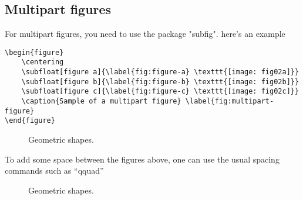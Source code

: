 \subsection{Multipart figures}
For multipart figures, you need to use the package "subfig". here's an example
\begin{verbatim}
\begin{figure}
    \centering
    \subfloat[figure a]{\label{fig:figure-a} \texttt{[image: fig02a]}}
    \subfloat[figure b]{\label{fig:figure-b} \texttt{[image: fig02b]}}
    \subfloat[figure c]{\label{fig:figure-c} \texttt{[image: fig02c]}}
    \caption{Sample of a multipart figure} \label{fig:multipart-figure}
\end{figure}
\end{verbatim}
\begin{figure}[h!]
        \centering
        \caption{Geometric shapes.}
        \label{fig:multipart-figure}
\end{figure}
To add some space between the figures above, one can use the usual spacing commands such as ``qquad''
\begin{figure}[h!]
        \centering
         \qquad
        \qquad
        \qquad
        \caption{Geometric shapes.}
        \label{fig:multipart-figure}
\end{figure} 
